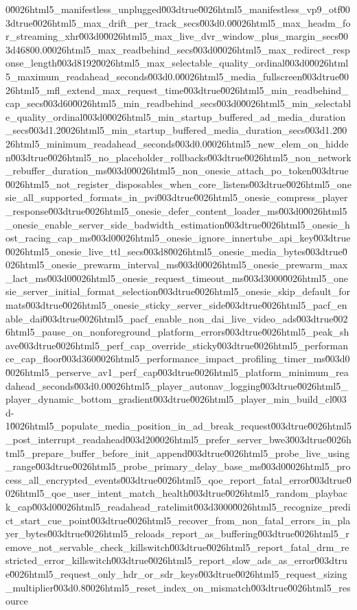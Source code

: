 {0\u0026html5_manifestless_unplugged\u003dtrue\u0026html5_manifestless_vp9_otf\u003dtrue\u0026html5_max_drift_per_track_secs\u003d0.0\u0026html5_max_headm_for_streaming_xhr\u003d0\u0026html5_max_live_dvr_window_plus_margin_secs\u003d46800.0\u0026html5_max_readbehind_secs\u003d0\u0026html5_max_redirect_response_length\u003d8192\u0026html5_max_selectable_quality_ordinal\u003d0\u0026html5_maximum_readahead_seconds\u003d0.0\u0026html5_media_fullscreen\u003dtrue\u0026html5_mfl_extend_max_request_time\u003dtrue\u0026html5_min_readbehind_cap_secs\u003d60\u0026html5_min_readbehind_secs\u003d0\u0026html5_min_selectable_quality_ordinal\u003d0\u0026html5_min_startup_buffered_ad_media_duration_secs\u003d1.2\u0026html5_min_startup_buffered_media_duration_secs\u003d1.2\u0026html5_minimum_readahead_seconds\u003d0.0\u0026html5_new_elem_on_hidden\u003dtrue\u0026html5_no_placeholder_rollbacks\u003dtrue\u0026html5_non_network_rebuffer_duration_ms\u003d0\u0026html5_non_onesie_attach_po_token\u003dtrue\u0026html5_not_register_disposables_when_core_listens\u003dtrue\u0026html5_onesie_all_supported_formats_in_pvi\u003dtrue\u0026html5_onesie_compress_player_response\u003dtrue\u0026html5_onesie_defer_content_loader_ms\u003d0\u0026html5_onesie_enable_server_side_badwidth_estimation\u003dtrue\u0026html5_onesie_host_racing_cap_ms\u003d0\u0026html5_onesie_ignore_innertube_api_key\u003dtrue\u0026html5_onesie_live_ttl_secs\u003d8\u0026html5_onesie_media_bytes\u003dtrue\u0026html5_onesie_prewarm_interval_ms\u003d0\u0026html5_onesie_prewarm_max_lact_ms\u003d0\u0026html5_onesie_request_timeout_ms\u003d3000\u0026html5_onesie_server_initial_format_selection\u003dtrue\u0026html5_onesie_skip_default_formats\u003dtrue\u0026html5_onesie_sticky_server_side\u003dtrue\u0026html5_pacf_enable_dai\u003dtrue\u0026html5_pacf_enable_non_dai_live_video_ads\u003dtrue\u0026html5_pause_on_nonforeground_platform_errors\u003dtrue\u0026html5_peak_shave\u003dtrue\u0026html5_perf_cap_override_sticky\u003dtrue\u0026html5_performance_cap_floor\u003d360\u0026html5_performance_impact_profiling_timer_ms\u003d0\u0026html5_perserve_av1_perf_cap\u003dtrue\u0026html5_platform_minimum_readahead_seconds\u003d0.0\u0026html5_player_autonav_logging\u003dtrue\u0026html5_player_dynamic_bottom_gradient\u003dtrue\u0026html5_player_min_build_cl\u003d-1\u0026html5_populate_media_position_in_ad_break_request\u003dtrue\u0026html5_post_interrupt_readahead\u003d20\u0026html5_prefer_server_bwe3\u003dtrue\u0026html5_prepare_buffer_before_init_append\u003dtrue\u0026html5_probe_live_using_range\u003dtrue\u0026html5_probe_primary_delay_base_ms\u003d0\u0026html5_process_all_encrypted_events\u003dtrue\u0026html5_qoe_report_fatal_error\u003dtrue\u0026html5_qoe_user_intent_match_health\u003dtrue\u0026html5_random_playback_cap\u003d0\u0026html5_readahead_ratelimit\u003d3000\u0026html5_recognize_predict_start_cue_point\u003dtrue\u0026html5_recover_from_non_fatal_errors_in_player_bytes\u003dtrue\u0026html5_reloads_report_as_buffering\u003dtrue\u0026html5_remove_not_servable_check_killswitch\u003dtrue\u0026html5_report_fatal_drm_restricted_error_killswitch\u003dtrue\u0026html5_report_slow_ads_as_error\u003dtrue\u0026html5_request_only_hdr_or_sdr_keys\u003dtrue\u0026html5_request_sizing_multiplier\u003d0.8\u0026html5_reset_index_on_mismatch\u003dtrue\u0026html5_resource}
